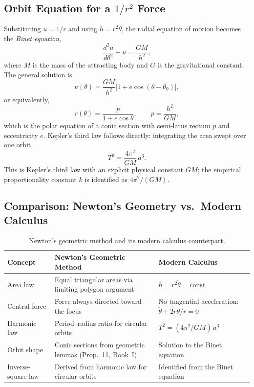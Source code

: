 \documentclass[12pt]{article}
\begin{document}
\subsection{Orbit Equation for a $1/r^{2}$ Force}

Substituting $u = 1/r$ and using $h = r^{2}\dot\theta$, the radial equation
of motion becomes the \emph{Binet equation},
\[
  \frac{d^{2}u}{d\theta^{2}} + u = \frac{GM}{h^{2}},
\]
where $M$ is the mass of the attracting body and $G$ is the gravitational
constant.
The general solution is
\[
  u(\theta) = \frac{GM}{h^{2}}\bigl[1 + e\cos(\theta - \theta_{0})\bigr],
\]
or equivalently,
\[
  r(\theta) = \frac{p}{1 + e\cos\theta}, \qquad
  p = \frac{h^{2}}{GM},
\]
which is the polar equation of a conic section with semi-latus rectum $p$
and eccentricity $e$.
Kepler's third law follows directly: integrating the area swept over one
orbit,
\[
  T^{2} = \frac{4\pi^{2}}{GM}\,a^{3}.
\]
This is Kepler's third law with an explicit physical constant $GM$;
the empirical proportionality constant $k$ is identified as $4\pi^{2}/(GM)$.

\subsection{Comparison: Newton's Geometry vs.\ Modern Calculus}

\begin{table}[h]
\centering
\renewcommand{\arraystretch}{1.3}
\begin{tabular}{p{3cm} p{5.5cm} p{5.5cm}}
\toprule
\textbf{Concept} & \textbf{Newton's Geometric Method} & \textbf{Modern Calculus} \\
\midrule
Area law
  & Equal triangular areas via limiting polygon argument
  & $h = r^{2}\dot\theta = \text{const}$ \\
Central force
  & Force always directed toward the focus
  & No tangential acceleration: $\ddot\theta + 2\dot r\dot\theta/r = 0$ \\
Harmonic law
  & Period--radius ratio for circular orbits
  & $T^{2} = (4\pi^{2}/GM)\,a^{3}$ \\
Orbit shape
  & Conic sections from geometric lemmas (Prop.\ 11, Book~I)
  & Solution to the Binet equation \\
Inverse-square law
  & Derived from harmonic law for circular orbits
  & Identified from the Binet equation \\
\bottomrule
\end{tabular}
\caption{Newton's geometric method and its modern calculus counterpart.}
\end{table}
\end{document}
